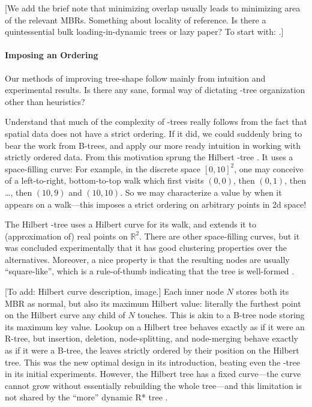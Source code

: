 [We add the brief note that minimizing overlap usually leads to minimizing area of the relevant MBRs.
Something about locality of reference.
Is there a quintessential bulk loading-in-dynamic trees or lazy paper?
To start with: \cite{argehinrichsvahrenholdvitter99}.]

\paragraph{Imposing an Ordering}
Our methods of improving tree-shape follow mainly from intuition and experimental results.
Is there any sane, formal way of dictating \rbase-tree organization other than heuristics?

Understand that much of the complexity of \rbase-trees really follows from the fact that spatial data does not have a strict ordering.
If it did, we could suddenly bring to bear the work from B-trees, and apply our more ready intuition in working with strictly ordered data.
From this motivation sprung the Hilbert \rbase-tree \cite{kamelfaloutsos94}.
It uses a space-filling curve:
For example, in the discrete space $[0,10]^2$, one may conceive of a left-to-right, bottom-to-top walk which first visits $(0,0)$, then $(0,1)$, then \ldots, then $(10,9)$ and $(10,10)$.
So we may characterize a value by when it appears on a walk---this imposes a strict ordering on arbitrary points in 2d space!

The Hilbert \rbase-tree uses a Hilbert curve for its walk, and extends it to (approximation of) real points on $\mathbb R^2$.
There are other space-filling curves, but it was concluded experimentally that it has good clustering properties \cite{kamelfaloutsos94} over the alternatives.
Moreover, a nice property is that the resulting nodes are usually ``square-like'', which is a rule-of-thumb indicating that the tree is well-formed \cite{kamelfaloutsos94,theodoridissellis96}.

[To add: Hilbert curve description, image.]
Each inner node $N$ stores both its MBR as normal, but also its maximum Hilbert value: literally the furthest point on the Hilbert curve any child of $N$ touches.
This is akin to a B-tree node storing its maximum key value.
Lookup on a Hilbert tree behaves exactly as if it were an R-tree, but insertion, deletion, node-splitting, and node-merging behave exactly as if it were a B-tree, the leaves strictly ordered by their position on the Hilbert tree.
This was the new optimal design in its introduction, beating even the \rstar-tree in its initial experiments.
However, the Hilbert tree has a fixed curve---the curve cannot grow without essentially rebuilding the whole tree---and this limitation is not shared by the ``more'' dynamic R* tree \cite{beckmannseeger09}.


